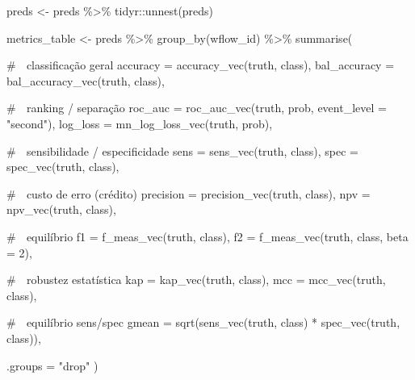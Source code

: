 \documentclass[
  letterpaper,
  DIV=11,
  numbers=noendperiod]{scrartcl}
\newenvironment{Shaded}{\begin{snugshade}}{\end{snugshade}}
\newcommand{\AttributeTok}[1]{\textcolor[rgb]{0.40,0.45,0.13}{#1}}
\newcommand{\CommentTok}[1]{\textcolor[rgb]{0.37,0.37,0.37}{#1}}
\newcommand{\DecValTok}[1]{\textcolor[rgb]{0.68,0.00,0.00}{#1}}
\newcommand{\FunctionTok}[1]{\textcolor[rgb]{0.28,0.35,0.67}{#1}}
\newcommand{\NormalTok}[1]{\textcolor[rgb]{0.00,0.23,0.31}{#1}}
\newcommand{\OtherTok}[1]{\textcolor[rgb]{0.00,0.23,0.31}{#1}}
\newcommand{\SpecialCharTok}[1]{\textcolor[rgb]{0.37,0.37,0.37}{#1}}
\newcommand{\StringTok}[1]{\textcolor[rgb]{0.13,0.47,0.30}{#1}}
\begin{document}
\begin{Shaded}
\begin{Highlighting}[]
\NormalTok{preds }\OtherTok{\textless{}{-}}\NormalTok{ preds }\SpecialCharTok{\%\textgreater{}\%}
\NormalTok{  tidyr}\SpecialCharTok{::}\FunctionTok{unnest}\NormalTok{(preds)}
\end{Highlighting}
\end{Shaded}

\begin{Shaded}
\begin{Highlighting}[]
\NormalTok{metrics\_table }\OtherTok{\textless{}{-}}\NormalTok{ preds }\SpecialCharTok{\%\textgreater{}\%}
  \FunctionTok{group\_by}\NormalTok{(wflow\_id) }\SpecialCharTok{\%\textgreater{}\%}
  \FunctionTok{summarise}\NormalTok{(}

    \CommentTok{\# 📌 classificação geral}
    \AttributeTok{accuracy =} \FunctionTok{accuracy\_vec}\NormalTok{(truth, class),}
    \AttributeTok{bal\_accuracy =} \FunctionTok{bal\_accuracy\_vec}\NormalTok{(truth, class),}

    \CommentTok{\# 📌 ranking / separação}
    \AttributeTok{roc\_auc =} \FunctionTok{roc\_auc\_vec}\NormalTok{(truth, prob, }\AttributeTok{event\_level =} \StringTok{"second"}\NormalTok{),}
    \AttributeTok{log\_loss =} \FunctionTok{mn\_log\_loss\_vec}\NormalTok{(truth, prob),}

    \CommentTok{\# 📌 sensibilidade / especificidade}
    \AttributeTok{sens =} \FunctionTok{sens\_vec}\NormalTok{(truth, class),}
    \AttributeTok{spec =} \FunctionTok{spec\_vec}\NormalTok{(truth, class),}

    \CommentTok{\# 📌 custo de erro (crédito)}
    \AttributeTok{precision =} \FunctionTok{precision\_vec}\NormalTok{(truth, class),}
    \AttributeTok{npv =} \FunctionTok{npv\_vec}\NormalTok{(truth, class),}

    \CommentTok{\# 📌 equilíbrio}
    \AttributeTok{f1 =} \FunctionTok{f\_meas\_vec}\NormalTok{(truth, class),}
    \AttributeTok{f2 =} \FunctionTok{f\_meas\_vec}\NormalTok{(truth, class, }\AttributeTok{beta =} \DecValTok{2}\NormalTok{),}

    \CommentTok{\# 📌 robustez estatística}
    \AttributeTok{kap =} \FunctionTok{kap\_vec}\NormalTok{(truth, class),}
    \AttributeTok{mcc =} \FunctionTok{mcc\_vec}\NormalTok{(truth, class),}

    \CommentTok{\# 📌 equilíbrio sens/spec}
    \AttributeTok{gmean =} \FunctionTok{sqrt}\NormalTok{(}\FunctionTok{sens\_vec}\NormalTok{(truth, class) }\SpecialCharTok{*} \FunctionTok{spec\_vec}\NormalTok{(truth, class)),}

    \AttributeTok{.groups =} \StringTok{"drop"}
\NormalTok{  )}
\end{Highlighting}
\end{Shaded}
\end{document}
